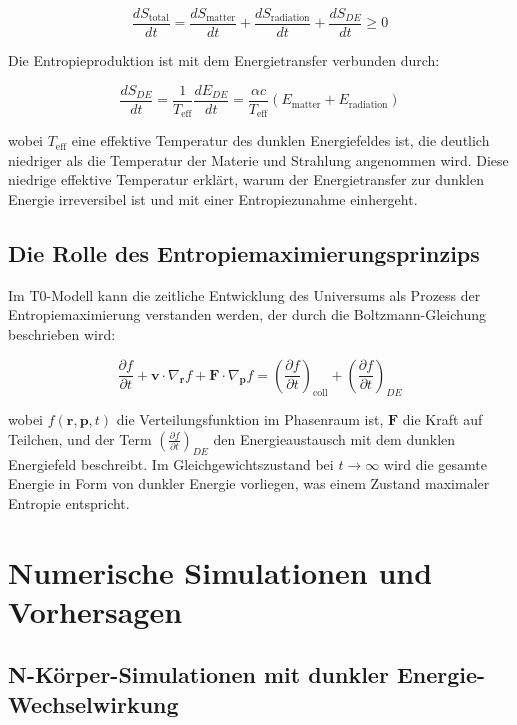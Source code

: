 \documentclass[a4paper,12pt]{article}
\theoremstyle{definition}
\theoremstyle{remark}
\begin{document}
	\begin{equation}
		\frac{dS_{\text{total}}}{dt} = \frac{dS_{\text{matter}}}{dt} + \frac{dS_{\text{radiation}}}{dt} + \frac{dS_{DE}}{dt} \geq 0
	\end{equation}
	
	Die Entropieproduktion ist mit dem Energietransfer verbunden durch:
	
	\begin{equation}
		\frac{dS_{DE}}{dt} = \frac{1}{T_{\text{eff}}}\frac{dE_{DE}}{dt} = \frac{\alpha c}{T_{\text{eff}}}(E_{\text{matter}} + E_{\text{radiation}})
	\end{equation}
	
	wobei $T_{\text{eff}}$ eine effektive Temperatur des dunklen Energiefeldes ist, die deutlich niedriger als die Temperatur der Materie und Strahlung angenommen wird. Diese niedrige effektive Temperatur erklärt, warum der Energietransfer zur dunklen Energie irreversibel ist und mit einer Entropiezunahme einhergeht.
	
	\subsection{Die Rolle des Entropiemaximierungsprinzips}
	
	Im T0-Modell kann die zeitliche Entwicklung des Universums als Prozess der Entropiemaximierung verstanden werden, der durch die Boltzmann-Gleichung beschrieben wird:
	
	\begin{equation}
		\frac{\partial f}{\partial t} + \mathbf{v} \cdot \nabla_{\mathbf{r}} f + \mathbf{F} \cdot \nabla_{\mathbf{p}} f = \left(\frac{\partial f}{\partial t}\right)_{\text{coll}} + \left(\frac{\partial f}{\partial t}\right)_{DE}
	\end{equation}
	
	wobei $f(\mathbf{r}, \mathbf{p}, t)$ die Verteilungsfunktion im Phasenraum ist, $\mathbf{F}$ die Kraft auf Teilchen, und der Term $\left(\frac{\partial f}{\partial t}\right)_{DE}$ den Energieaustausch mit dem dunklen Energiefeld beschreibt. Im Gleichgewichtszustand bei $t \rightarrow \infty$ wird die gesamte Energie in Form von dunkler Energie vorliegen, was einem Zustand maximaler Entropie entspricht.
	
	\section{Numerische Simulationen und Vorhersagen}
	
	\subsection{N-Körper-Simulationen mit dunkler Energie-Wechselwirkung}
	
\end{document}
